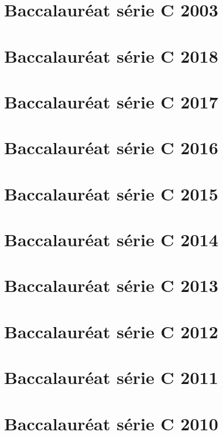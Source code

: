 \section{Baccalauréat série C 2003}

\newpage
\begin{corrige}

\section{Baccalauréat série C 2018}
{\color{loko2}}

\section{Baccalauréat série C 2017}
{\color{loko2}}

\section{Baccalauréat série C 2016}
{\color{loko2}}

\section{Baccalauréat série C 2015}
{\color{loko2}}

\section{Baccalauréat série C 2014}
{\color{loko2}}

\section{Baccalauréat série C 2013}
{\color{loko2}}

\section{Baccalauréat série C 2012}
{\color{loko2}}

\section{Baccalauréat série C 2011}
{\color{loko2}}

\section{Baccalauréat série C 2010}
{\color{loko2}}


\end{corrige}
